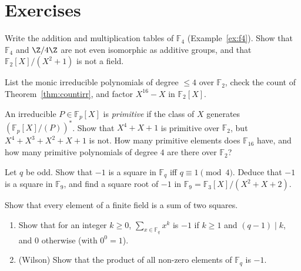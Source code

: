 \section{Exercises}

\begin{exercise}[$\star$]\label{ex:f4tables}
Write the addition and multiplication tables of $\mathbb F_4$ (Example~\ref{ex:f4}). Show that $\mathbb F_4$ and $\Z/4\Z$ are not even isomorphic as additive groups, and that $\mathbb F_2[X]/(X^2+1)$ is not a field.
\end{exercise}

\begin{exercise}[$\star$]\label{ex:irrF2}
List the monic irreducible polynomials of degree $\le4$ over $\mathbb F_2$, check the count of Theorem~\ref{thm:countirr}, and factor $X^{16}-X$ in $\mathbb F_2[X]$.
\end{exercise}

\begin{exercise}[$\star\star$]\label{ex:primpoly}
An irreducible $P\in\mathbb F_p[X]$ is \emph{primitive} if the class of $X$ generates $(\mathbb F_p[X]/(P))^*$. Show that $X^4+X+1$ is primitive over $\mathbb F_2$, but $X^4+X^3+X^2+X+1$ is not. How many primitive elements does $\mathbb F_{16}$ have, and how many primitive polynomials of degree $4$ are there over $\mathbb F_2$?
\end{exercise}

\begin{exercise}[$\star\star$]\label{ex:minus1}
Let $q$ be odd. Show that $-1$ is a square in $\mathbb F_q$ iff $q\equiv1\pmod4$. Deduce that $-1$ is a square in $\mathbb F_9$, and find a square root of $-1$ in $\mathbb F_9=\mathbb F_3[X]/(X^2+X+2)$.
\end{exercise}

\begin{exercise}[$\star\star$]\label{ex:twosq}
Show that every element of a finite field is a sum of two squares.
\end{exercise}

\begin{exercise}[$\star\star$]\label{ex:powersums}
\begin{enumerate}[label=(\alph*)]
\item Show that for an integer $k\ge0$, $\displaystyle\sum_{x\in\mathbb F_q}x^k$ is $-1$ if $k\ge1$ and $(q-1)\mid k$, and $0$ otherwise (with $0^0=1$).
\item (Wilson) Show that the product of all non-zero elements of $\mathbb F_q$ is $-1$.
\end{enumerate}
\end{exercise}

